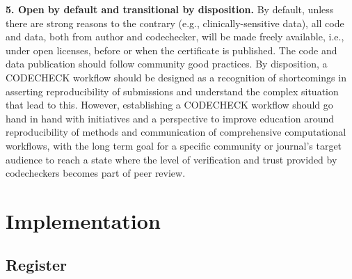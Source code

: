 \documentclass[12pt]{article}
\begin{document}
\textbf{5. Open by default and transitional by disposition.} %
By default, unless there are strong
reasons to the contrary (e.g., clinically-sensitive data), all code and
data, both from author and codechecker, will be made freely available, i.e., 
under open licenses, before or when the certificate is published.
The code and data  publication should follow community good practices.
By disposition, a CODECHECK workflow should be designed as a recognition of
shortcomings in asserting reproducibility of submissions and understand the
complex situation that lead to this. However, establishing a CODECHECK workflow
should go hand in hand with initiatives and a perspective to improve education
around reproducibility of methods and communication of comprehensive 
computational workflows, with the long term goal for a specific community or
journal's target audience to reach a state where the level of verification 
and trust provided by codecheckers becomes part of peer review.

\section*{Implementation}\label{implementation}

\subsection*{Register}\label{register}
\end{document}
